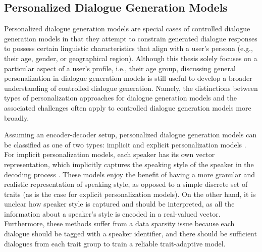 
\subsection{Personalized Dialogue Generation Models}
Personalized dialogue generation models are special cases of controlled dialogue generation models in that they attempt to constrain generated dialogue responses to possess certain linguistic characteristics that align with a user's persona (e.g., their age, gender, or geographical region).
Although this thesis solely focuses on a particular aspect of a user's profile, i.e., their age group, discussing general personalization in dialogue generation models is still useful to develop a broader understanding of controlled dialogue generation. Namely, the distinctions between types of personalization approaches for dialogue generation models and the associated challenges often apply to controlled dialogue generation models more broadly.

Assuming an encoder-decoder setup, personalized dialogue generation models can be classified as one of two types: implicit and explicit personalization models \cite{zheng2019personalized}. For implicit personalization models, each speaker has its own vector representation, which implicitly captures the speaking style of the speaker in the decoding process \citep{ijcai2017-521, li-etal-2016-persona}. These models enjoy the benefit of having a more granular and realistic representation of speaking style, as opposed to a simple discrete set of traits (as is the case for explicit personalization models). On the other hand, it is unclear how speaker style is captured and should be interpreted, as all the information about a speaker's style is encoded in a real-valued vector. Furthermore, these methods suffer from a data sparsity issue because each dialogue should be tagged with a speaker identifier, and there should be sufficient dialogues from each trait group to train a reliable trait-adaptive model. 

